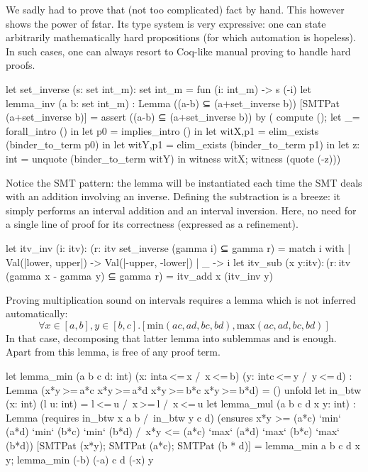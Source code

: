 \documentclass{llncs}
\begin{document}
We sadly had to prove that (not too complicated) fact by hand.
%
This however shows the power of \gls{fstar}. Its type system is
very expressive: one can state arbitrarily mathematically hard
propositions (for which automation is hopeless).
%
In such cases, one can always resort to Coq-like manual proving to
handle hard proofs.
%
\begin{fstarcode}
let set_inverse (s: set int_m): set int_m = fun (i: int_m) -> s (-i)
let lemma_inv (a b: set int_m)
  : Lemma ((a-b) ⊆ (a+set_inverse b)) [SMTPat (a+set_inverse b)]
  = assert ((a-b) ⊆ (a+set_inverse b)) by (  compute ();
      let _= forall_intro () in let p0 = implies_intro () in
      let witX,p1 = elim_exists (binder_to_term p0) in
      let witY,p1 = elim_exists (binder_to_term p1) in
      let z: int = unquote (binder_to_term witY) in
      witness witX; witness (quote (-z)))
\end{fstarcode}
%
Notice the SMT pattern: the lemma  will be
instantiated each time the SMT deals with an addition involving an
inverse.
%
Defining the subtraction  is a breeze: it simply
performs an interval addition and an interval inversion.
%
Here, no need for a single line of proof for its correctness
(expressed as a refinement).
%
\begin{fstarcode}
let itv_inv (i: itv): (r: itv {set_inverse (gamma i) ⊆ gamma r})
  = match i with | Val(|lower, upper|) -> Val(|-upper, -lower|) | _ -> i
let itv_sub (x y:itv): (r: itv {(gamma  x - gamma  y) ⊆ gamma  r}) = itv_add x (itv_inv y)
\end{fstarcode}
%
Proving multiplication sound on intervals requires a lemma which is
not inferred automatically:
%
\[
\forall x \in [a,b], y\in[b,c].
   \left[
       \mathrm{min}\left(ac,ad,bc,bd\right)
     , \mathrm{max}\left(ac,ad,bc,bd\right)
   \right]
\]
%
In that case, decomposing that latter lemma into sublemmas
 and  is enough.
%
Apart from this lemma,  is free of any proof term.
%
\begin{fstarcode}
let lemma_min (a b c d: int) (x: int{a <= x /\ x <= b}) (y: int{c <= y /\ y <= d})
  : Lemma (x*y >= a*c \/ x*y >= a*d \/ x*y >= b*c \/ x*y >= b*d) = ()
unfold let in_btw (x: int) (l u: int) = l <= u /\ x >= l /\ x <= u
let lemma_mul (a b c d x y: int)
  : Lemma (requires in_btw x a b /\ in_btw y c d)
    (ensures x*y >= (a*c) `min` (a*d) `min` (b*c) `min` (b*d)
           /\ x*y <= (a*c) `max` (a*d) `max` (b*c) `max` (b*d))
    [SMTPat (x*y); SMTPat (a*c); SMTPat (b * d)]
  = lemma_min a b c d x y; lemma_min (-b) (-a) c d (-x) y
\end{fstarcode}
%
\end{document}
